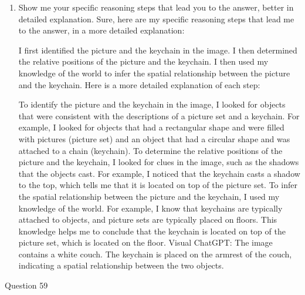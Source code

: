 \begin{enumerate}
    Here are some additional details about the spatial relationship between the picture set and the keychain:
    
    The picture set is a set of pictures that are typically used for decoration.
    The keychain is a small, metal object that is used to attach keys to a belt loop or purse.
    The keychain is located on top of the picture set, meaning that it is resting on the picture set.
    The picture set is located below the keychain, meaning that it is supporting the keychain.
    Is there anything else I can help you with?
    \subitem Visual ChatGPT: The image contains a white couch with a keychain placed on the armrest of the couch.
    \item Show me your specific reasoning steps that lead you to the answer, better in detailed explanation.
    \subitem 
    Sure, here are my specific reasoning steps that lead me to the answer, in a more detailed explanation:
    
    I first identified the picture and the keychain in the image.
    I then determined the relative positions of the picture and the keychain.
    I then used my knowledge of the world to infer the spatial relationship between the picture and the keychain.
    Here is a more detailed explanation of each step:
    
    To identify the picture and the keychain in the image, I looked for objects that were consistent with the descriptions of a picture set and a keychain. For example, I looked for objects that had a rectangular shape and were filled with pictures (picture set) and an object that had a circular shape and was attached to a chain (keychain).
    To determine the relative positions of the picture and the keychain, I looked for clues in the image, such as the shadows that the objects cast. For example, I noticed that the keychain casts a shadow to the top, which tells me that it is located on top of the picture set.
    To infer the spatial relationship between the picture and the keychain, I used my knowledge of the world. For example, I know that keychains are typically attached to objects, and picture sets are typically placed on floors. This knowledge helps me to conclude that the keychain is located on top of the picture set, which is located on the floor.
    \subitem Visual ChatGPT: The image contains a white couch. The keychain is placed on the armrest of the couch, indicating a spatial relationship between the two objects.
\end{enumerate}
Question 59\\

